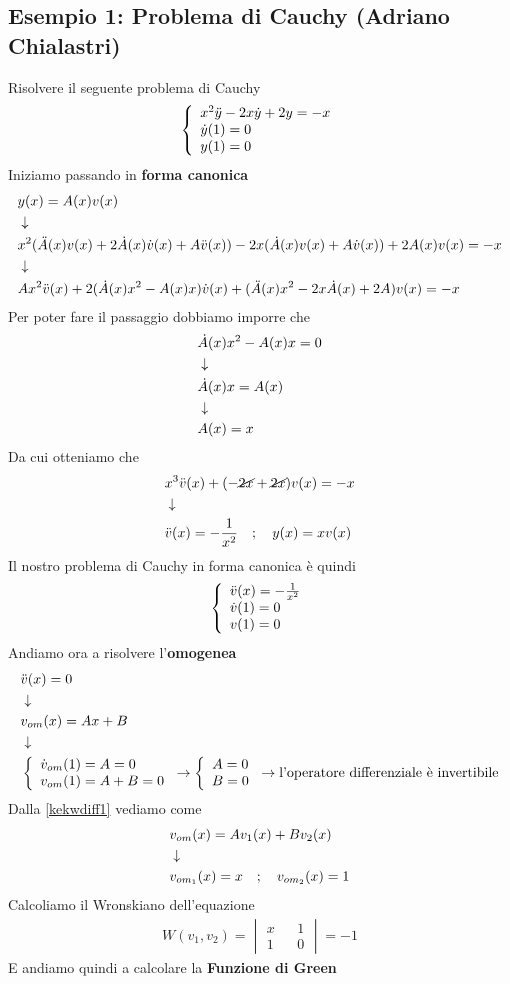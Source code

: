 \subsection{Esempio 1: Problema di Cauchy (Adriano Chialastri) \label{canon}}
Risolvere il seguente problema di Cauchy
\begin{align}
	\triple{x^2 \ddot{y} - 2x \dot{y} + 2y = -x}{\dot{y}(1)=0\hfill}{y(1)=0\hfill}
\end{align}
Iniziamo passando in \textbf{forma canonica}
\begin{align}
	&y(x) = A(x)v(x)	\\ &\downarrow \nonumber \\
	&x^2 (\ddot{A}(x)v(x) + 2\dot{A}(x)\dot{v}(x) + A \ddot{v}(x)) - 2x (\dot{A}(x)v(x) + A \dot{v}(x)) + 2A(x)v(x) = -x \nonumber \\ &\downarrow \nonumber \\
	&Ax^2 \ddot{v}(x) + 2(\dot{A}(x) x^2 - A(x)x) \dot{v}(x) + (\ddot{A}(x) x^2 - 2x\dot{A}(x) +2A)v(x) = -x	
\end{align}
Per poter fare il passaggio dobbiamo imporre che
\begin{align}
	&\dot{A}(x) x^2 - A(x)x = 0 \\ &\downarrow \nonumber \\
	&\dot{A}(x) x = A(x) \nonumber \\ &\downarrow \nonumber \\
	&A(x) = x  
\end{align}
Da cui otteniamo che
\begin{align}
	&x^3 \ddot{v}(x) + (-\cancel{2x} +\cancel{2x})v(x) = -x	\\ &\downarrow \nonumber \\
	&\ddot{v}(x) = -\frac{1}{x^2} \quad ; \quad y(x) = x v(x)
\end{align}
Il nostro problema di Cauchy in forma canonica è quindi
\begin{align}
	\triple{\ddot{v}(x) = -\frac{1}{x^2}}{\dot{v}(1)=0\hfill}{v(1)=0\hfill}
\end{align}
Andiamo ora a risolvere l'\textbf{omogenea}
\begin{align}
	&\ddot{v}(x) = 0 \firstpassage
	&v_{om}(x) = Ax + B  \label{kekwdiff1}\firstpassage
	&\double{\dot{v}_{om}(1)=A=0\hfill}{v_{om}(1)=A+B=0} \to \double{A=0}{B=0} \to \text{l'operatore differenziale è invertibile} 
\end{align}
Dalla \ref{kekwdiff1} vediamo come
\begin{align}
	&v_{om}(x) = A v_1(x) + B v_2(x) \nonumber \\ &\downarrow \nonumber \\
	&v_{om_1}(x) = x \quad ; \quad v_{om_2}(x) = 1
\end{align}
Calcoliamo il Wronskiano dell'equazione
\begin{align}
	W(v_1,v_2) = \begin{vmatrix}
		x && 1 \\
		1 && 0
	\end{vmatrix} = -1
\end{align}
E andiamo quindi a calcolare la \textbf{Funzione di Green}

